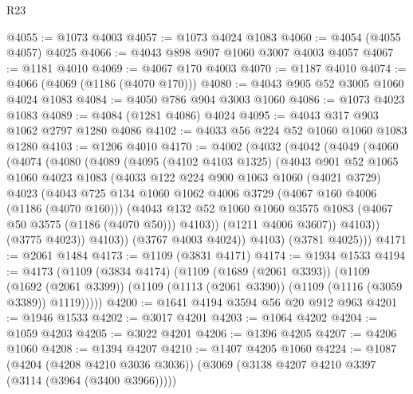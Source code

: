 \begin{lexlean}{R23}
\begin{coremodule}
@4055 := @1073 @4003
@4057 := @1073 @4024 @1083
@4060 := @4054 (@4055 @4057) @4025
@4066 := @4043 @898 @907 @1060 @3007 @4003 @4057
@4067 := @1181 @4010
@4069 := @4067 @170 @4003
@4070 := @1187 @4010
@4074 := @4066 (@4069 (@1186 (@4070 @170)))
@4080 := @4043 @905 @52 @3005 @1060 @4024 @1083
@4084 := @4050 @786 @904 @3003 @1060
@4086 := @1073 @4023 @1083
@4089 := @4084 (@1281 @4086) @4024
@4095 := @4043 @317 @903 @1062 @2797 @1280 @4086
@4102 := @4033 @56 @224 @52 @1060 @1060 @1083 @1280
@4103 := @1206 @4010
@4170 := @4002
    (@4032
      (@4042
        (@4049
          (@4060
            (@4074
              (@4080
                (@4089
                  (@4095
                    (@4102 @4103 @1325)
                    (@4043
                      @901
                      @52
                      @1065
                      @1060
                      @4023
                      @1083
                      (@4033
                        @122
                        @224
                        @900
                        @1063
                        @1060
                        (@4021 @3729)
                        @4023
                        (@4043
                          @725
                          @134
                          @1060
                          @1062
                          @4006
                          @3729
                          (@4067 @160 @4006 (@1186 (@4070 @160)))
                          (@4043
                            @132
                            @52
                            @1060
                            @1060
                            @3575
                            @1083
                            (@4067 @50 @3575 (@1186 (@4070 @50)))
                            @4103))
                        (@1211 @4006 @3607))
                      @4103))
                  (@3775 @4023))
                @4103))
            (@3767 @4003 @4024))
          @4103)
        (@3781 @4025)))
@4171 := @2061 @1484
@4173 := @1109 (@3831 @4171)
@4174 := @1934 @1533
@4194 := @4173
    (@1109
      (@3834 @4174)
      (@1109
        (@1689 (@2061 @3393))
        (@1109
          (@1692 (@2061 @3399))
          (@1109 (@1113 (@2061 @3390)) (@1109 (@1116 (@3059 @3389)) @1119)))))
@4200 := @1641 @4194 @3594 @56 @20 @912 @963
@4201 := @1946 @1533
@4202 := @3017 @4201
@4203 := @1064 @4202
@4204 := @1059 @4203
@4205 := @3022 @4201
@4206 := @1396 @4205
@4207 := @4206 @1060
@4208 := @1394 @4207
@4210 := @1407 @4205 @1060
@4224 := @1087
    (@4204 (@4208 @4210 @3036 @3036))
    (@3069 (@3138 @4207 @4210 @3397 (@3114 (@3964 (@3400 @3966)))))

\end{coremodule}
\end{lexlean}
